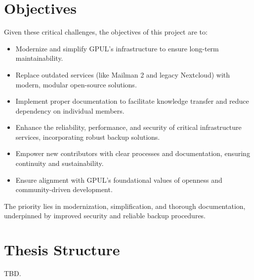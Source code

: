 \section{Objectives}

Given these critical challenges, the objectives of this project are to:

\begin{itemize}
    \item Modernize and simplify GPUL's infrastructure to ensure long-term maintainability.
    \item Replace outdated services (like Mailman 2 and legacy Nextcloud) with modern, modular open-source solutions.
    \item Implement proper documentation to facilitate knowledge transfer and reduce dependency on individual members.
    \item Enhance the reliability, performance, and security of critical infrastructure services, incorporating robust backup solutions.
    \item Empower new contributors with clear processes and documentation, ensuring continuity and sustainability.
    \item Ensure alignment with GPUL's foundational values of openness and community-driven development.
\end{itemize}

The priority lies in modernization, simplification, and thorough documentation, underpinned by improved security and reliable backup procedures.

\section{Thesis Structure}

TBD.
